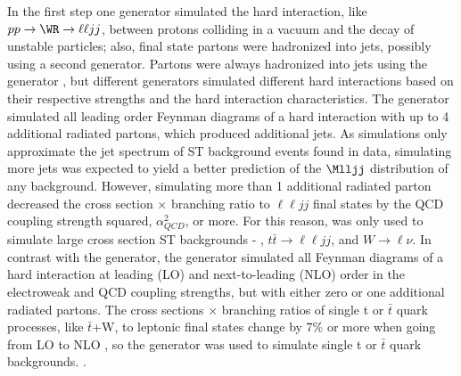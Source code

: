 In the first step one \MC generator simulated the hard interaction, like $pp \rightarrow \WR \rightarrow \ell\ell jj$, 
between protons colliding in a vacuum and the decay of unstable particles; also, final state partons were hadronized 
into jets, possibly using a second \MC generator.  Partons were always hadronized into jets using the \PYTHIA generator 
\cite{pythia8,Sjostrand:2006za}, but different generators simulated different hard interactions based on their respective 
strengths and the hard interaction characteristics.  The \MADGRAPH generator \cite{madgraph} simulated all leading 
order Feynman diagrams of a hard interaction with up to 4 additional radiated partons, which produced additional jets.  
As simulations only approximate the jet spectrum of ST background events found in data, simulating more jets was expected 
to yield a better prediction of the $\Mlljj$ distribution of any background.  However, simulating more than 1 additional 
radiated parton decreased the cross section $\times$ branching ratio to $\ell\ell jj$ final states by the QCD coupling 
strength squared, $\alpha_{QCD}^{2}$, or more.  For this reason, \MADGRAPH was only used to simulate large cross section ST 
backgrounds - \DY, $t\bar{t} \rightarrow \ell\ell jj$, and $W \rightarrow \ell\nu$.  In contrast with the \MADGRAPH generator, 
the \POWHEG generator \cite{powheg} simulated all Feynman diagrams of a hard interaction at leading (LO) and next-to-leading (NLO) 
order in the electroweak and QCD coupling strengths, but with either zero or one additional radiated partons.  The cross 
sections $\times$ branching ratios of single t or $\bar{t}$ quark processes, like $\bar{t}$+W, to leptonic final states change 
by 7\% or more when going from LO to NLO \cite{singleTopNLOvsLO}, so the \POWHEG generator was used to simulate single 
t or $\bar{t}$ quark backgrounds.  .


